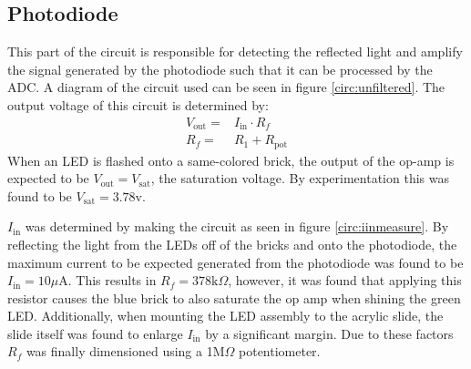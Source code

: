 \subsection{Photodiode}
This part of the circuit is responsible for detecting the reflected light and amplify the signal generated by the photodiode such that it can be processed by the ADC. A diagram of the circuit used can be seen in figure \ref{circ:unfiltered}.
The output voltage of this circuit is determined by:
\begin{eqnarray}
	V_{\text{out}}=&I_{\text{in}}\cdot R_f\\
	R_f =& R_1+R_{\text{pot}}
\end{eqnarray}
When an LED is flashed onto a same-colored brick, the output of the op-amp is expected to be $V_{\text{out}} = V_{\text{sat}}$, the saturation voltage. By experimentation this was found to be $V_{\text{sat}}=3.78$v.

$I_{\text{in}}$ was determined by making the circuit as seen in figure \ref{circ:iinmeasure}. By reflecting the light from the LEDs off of the bricks and onto the photodiode, the maximum current to be expected generated from the photodiode was found to be $I_{\text{in}}=10\mu$A.
This results in $R_f=378\text{k}\Omega$, however, it was found that applying this resistor causes the blue brick to also saturate the op amp when shining the green LED. Additionally, when mounting the LED assembly to the acrylic slide, the slide itself was found to enlarge $I_{\text{in}}$ by a significant margin. Due to these factors $R_f$ was finally dimensioned using a 1M$\Omega$ potentiometer. 

